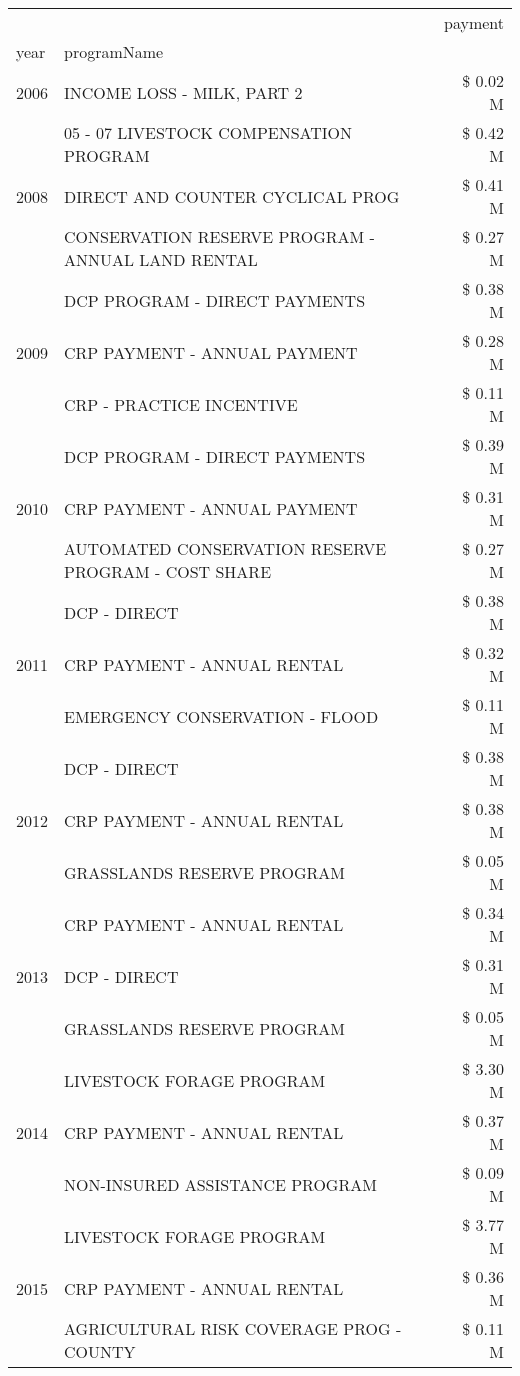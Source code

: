\begin{tabular}{llr}
\toprule
 &  & payment \\
year & programName &  \\
\midrule
2006 & INCOME LOSS - MILK, PART 2 & \$ 0.02 M \\
\cline{1-3}
\multirow[t]{3}{*}{2008} & 05 - 07 LIVESTOCK COMPENSATION PROGRAM & \$ 0.42 M \\
 & DIRECT AND COUNTER CYCLICAL PROG & \$ 0.41 M \\
 & CONSERVATION RESERVE PROGRAM - ANNUAL LAND RENTAL & \$ 0.27 M \\
\cline{1-3}
\multirow[t]{3}{*}{2009} & DCP PROGRAM - DIRECT PAYMENTS & \$ 0.38 M \\
 & CRP PAYMENT - ANNUAL PAYMENT & \$ 0.28 M \\
 & CRP - PRACTICE INCENTIVE & \$ 0.11 M \\
\cline{1-3}
\multirow[t]{3}{*}{2010} & DCP PROGRAM - DIRECT PAYMENTS & \$ 0.39 M \\
 & CRP PAYMENT - ANNUAL PAYMENT & \$ 0.31 M \\
 & AUTOMATED CONSERVATION RESERVE PROGRAM - COST SHARE & \$ 0.27 M \\
\cline{1-3}
\multirow[t]{3}{*}{2011} & DCP - DIRECT & \$ 0.38 M \\
 & CRP PAYMENT - ANNUAL RENTAL & \$ 0.32 M \\
 & EMERGENCY CONSERVATION - FLOOD & \$ 0.11 M \\
\cline{1-3}
\multirow[t]{3}{*}{2012} & DCP - DIRECT & \$ 0.38 M \\
 & CRP PAYMENT - ANNUAL RENTAL & \$ 0.38 M \\
 & GRASSLANDS RESERVE PROGRAM & \$ 0.05 M \\
\cline{1-3}
\multirow[t]{3}{*}{2013} & CRP PAYMENT - ANNUAL RENTAL & \$ 0.34 M \\
 & DCP - DIRECT & \$ 0.31 M \\
 & GRASSLANDS RESERVE PROGRAM & \$ 0.05 M \\
\cline{1-3}
\multirow[t]{3}{*}{2014} & LIVESTOCK FORAGE PROGRAM & \$ 3.30 M \\
 & CRP PAYMENT - ANNUAL RENTAL & \$ 0.37 M \\
 & NON-INSURED ASSISTANCE PROGRAM & \$ 0.09 M \\
\cline{1-3}
\multirow[t]{3}{*}{2015} & LIVESTOCK FORAGE PROGRAM & \$ 3.77 M \\
 & CRP PAYMENT - ANNUAL RENTAL & \$ 0.36 M \\
 & AGRICULTURAL RISK COVERAGE PROG - COUNTY & \$ 0.11 M \\

\end{tabular}

